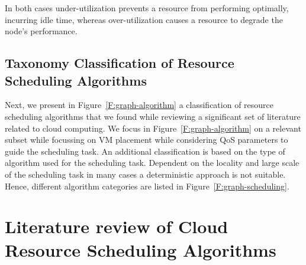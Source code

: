 \documentclass[final,5p,times,twocolumn]{elsarticle}
\begin{document}
In both cases under-utilization prevents a resource from performing optimally, incurring idle time, whereas over-utilization causes a resource to degrade the node's performance.





\subsection{Taxonomy Classification of Resource Scheduling Algorithms}\label{S:algo}

Next, we present in Figure~\ref{F:graph-algorithm} a classification of resource scheduling algorithms that we found while reviewing a significant set of literature related to cloud computing. We focus in Figure~\ref{F:graph-algorithm} on a relevant subset while focussing on VM placement while considering QoS parameters to guide the scheduling task. An additional classification is based on the type of algorithm used for the scheduling task. Dependent on the locality and large scale of the scheduling task in many cases a deterministic approach is not suitable. Hence, different algorithm categories are listed in Figure~\ref{F:graph-scheduling}.










\section{Literature review of Cloud Resource Scheduling Algorithms}\label{sec:literature}
\end{document}
